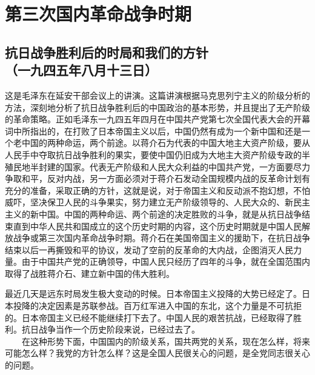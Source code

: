 \documentclass[cn,11pt,chinese]{elegantbook}
\def\myformat#1{\hfil\hfil #1}
\begin{document}
\chapter*{第三次国内革命战争时期}\newpage\section*{\myformat{抗日战争胜利后的时局和我们的方针}\\\myformat{（一九四五年八月十三日）}}
\begin{introduction}\item  这是毛泽东在延安干部会议上的讲演。这篇讲演根据马克思列宁主义的阶级分析的方法，深刻地分析了抗日战争胜利后的中国政治的基本形势，并且提出了无产阶级的革命策略。正如毛泽东一九四五年四月在中国共产党第七次全国代表大会的开幕词中所指出的，在打败了日本帝国主义以后，中国仍然有成为一个新中国和还是一个老中国的两种命运，两个前途。以蒋介石为代表的中国大地主大资产阶级，要从人民手中夺取抗日战争胜利的果实，要使中国仍旧成为大地主大资产阶级专政的半殖民地半封建的国家。代表无产阶级和人民大众利益的中国共产党，一方面要尽力争取和平，反对内战，另一方面必须对于蒋介石发动全国规模内战的反革命计划有充分的准备，采取正确的方针，这就是说，对于帝国主义和反动派不抱幻想，不怕威吓，坚决保卫人民的斗争果实，努力建立无产阶级领导的、人民大众的、新民主主义的新中国。中国的两种命运、两个前途的决定胜败的斗争，就是从抗日战争结束直到中华人民共和国成立的这个历史时期的内容，这个历史时期就是中国人民解放战争或第三次国内革命战争时期。蒋介石在美国帝国主义的援助下，在抗日战争结束以后一再撕毁和平的协议，发动了空前的反革命的大内战，企图消灭人民力量。由于中国共产党的正确领导，中国人民只经历了四年的斗争，就在全国范围内取得了战胜蒋介石、建立新中国的伟大胜利。\end{introduction}
最近几天是远东时局发生极大变动的时候。日本帝国主义投降的大势已经定了。日本投降的决定因素是苏联参战。百万红军进入中国的东北，这个力量是不可抗拒的。日本帝国主义已经不能继续打下去了。中国人民的艰苦抗战，已经取得了胜利。抗日战争当作一个历史阶段来说，已经过去了。\\
　　在这种形势下面，中国国内的阶级关系，国共两党的关系，现在怎么样，将来可能怎么样？我党的方针怎么样？这是全国人民很关心的问题，是全党同志很关心的问题。\\
\end{document}
